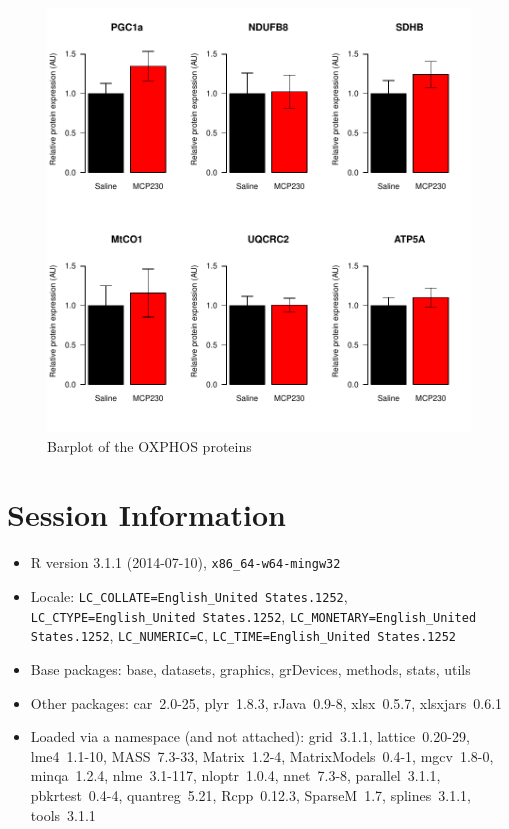 \documentclass{article}
\begin{document}
\begin{figure}
\begin{center}
\includegraphics{2016-01-21_MitochondrialProteins-barplot-combined}
\end{center}
\caption{Barplot of the OXPHOS proteins}
\label{fig:barplot-combined}
\end{figure}

\section*{Session Information}
\begin{itemize}\raggedright
  \item R version 3.1.1 (2014-07-10), \verb|x86_64-w64-mingw32|
  \item Locale: \verb|LC_COLLATE=English_United States.1252|, \verb|LC_CTYPE=English_United States.1252|, \verb|LC_MONETARY=English_United States.1252|, \verb|LC_NUMERIC=C|, \verb|LC_TIME=English_United States.1252|
  \item Base packages: base, datasets, graphics, grDevices, methods,
    stats, utils
  \item Other packages: car~2.0-25, plyr~1.8.3, rJava~0.9-8,
    xlsx~0.5.7, xlsxjars~0.6.1
  \item Loaded via a namespace (and not attached): grid~3.1.1,
    lattice~0.20-29, lme4~1.1-10, MASS~7.3-33, Matrix~1.2-4,
    MatrixModels~0.4-1, mgcv~1.8-0, minqa~1.2.4, nlme~3.1-117,
    nloptr~1.0.4, nnet~7.3-8, parallel~3.1.1, pbkrtest~0.4-4,
    quantreg~5.21, Rcpp~0.12.3, SparseM~1.7, splines~3.1.1, tools~3.1.1
\end{itemize}
\end{document}
